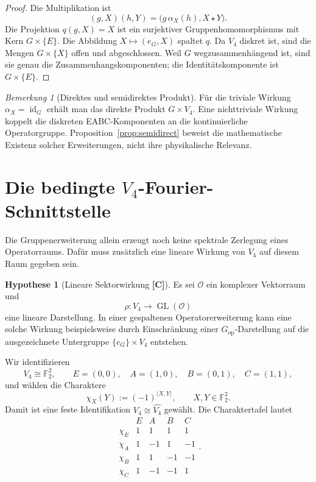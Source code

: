 \documentclass[11pt,a4paper,reqno]{amsart}
\theoremstyle{definition}
\newtheorem{hypothesis}[theorem]{Hypothese}
\theoremstyle{remark}
\newtheorem{remark}[theorem]{Bemerkung}
\newcommand{\FF}{\mathbb{F}}
\newcommand{\id}{\operatorname{id}}
\newcommand{\Oh}{\mathcal{O}}
\newcommand{\StatusC}{\textnormal{\textbf{[C]}}}
\begin{document}
\begin{proof}
Die Multiplikation ist
\begin{equation}
(g,X)(h,Y)
=
\bigl(g\,\alpha_X(h),X\star Y\bigr).
\end{equation}
Die Projektion $q(g,X)=X$ ist ein surjektiver Gruppenhomomorphismus mit Kern $G\times\{E\}$. Die Abbildung $X\mapsto(e_G,X)$ spaltet $q$. Da $V_4$ diskret ist, sind die Mengen $G\times\{X\}$ offen und abgeschlossen. Weil $G$ wegzusammenhängend ist, sind sie genau die Zusammenhangskomponenten; die Identitätskomponente ist $G\times\{E\}$.
\end{proof}

\begin{remark}[Direktes und semidirektes Produkt]
Für die triviale Wirkung $\alpha_X=\id_G$ erhält man das direkte Produkt $G\times V_4$. Eine nichttriviale Wirkung koppelt die diskreten EABC-Komponenten an die kontinuierliche Operatorgruppe. Proposition~\ref{prop:semidirect} beweist die mathematische Existenz solcher Erweiterungen, nicht ihre physikalische Relevanz.
\end{remark}

\section{Die bedingte \texorpdfstring{$V_4$}{V4}-Fourier-Schnittstelle}

Die Gruppenerweiterung allein erzeugt noch keine spektrale Zerlegung eines Operatorraums. Dafür muss zusätzlich eine lineare Wirkung von $V_4$ auf diesem Raum gegeben sein.

\begin{hypothesis}[Lineare Sektorwirkung \StatusC]
\label{hyp:v4-action}
Es sei $\Oh$ ein komplexer Vektorraum und
\begin{equation}
\rho:V_4\longrightarrow\operatorname{GL}(\Oh)
\end{equation}
eine lineare Darstellung. In einer gespaltenen Operatorerweiterung kann eine solche Wirkung beispielsweise durch Einschränkung einer $G_{\mathrm{op}}$-Darstellung auf die ausgezeichnete Untergruppe $\{e_G\}\times V_4$ entstehen.
\end{hypothesis}

Wir identifizieren
\begin{equation}
V_4\cong\FF_2^2,
\qquad
E=(0,0),\quad A=(1,0),\quad B=(0,1),\quad C=(1,1),
\end{equation}
und wählen die Charaktere
\begin{equation}
\chi_X(Y):=(-1)^{\langle X,Y\rangle},
\qquad X,Y\in\FF_2^2.
\end{equation}
Damit ist eine feste Identifikation $V_4\cong\widehat{V_4}$ gewählt. Die Charaktertafel lautet
\begin{equation}
\begin{array}{c|rrrr}
 & E & A & B & C\\
\hline
\chi_E & 1& 1& 1& 1\\
\chi_A & 1&-1& 1&-1\\
\chi_B & 1& 1&-1&-1\\
\chi_C & 1&-1&-1& 1
\end{array}.
\end{equation}
\end{document}
